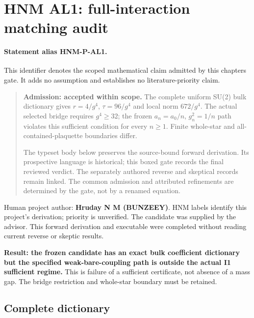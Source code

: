 \hypertarget{r29-al1-al1-forward-hnm-full-interaction-matching-audit}{%
\section{HNM AL1: full-interaction matching audit\workstar}\label{r29:al1:r29-al1-al1-forward-hnm-full-interaction-matching-audit}}
\paragraph{Statement alias HNM-P-AL1.}\label{stmt:AL1} This identifier denotes the scoped mathematical claim admitted by this chapter\textquotesingle s gate. It adds no assumption and establishes no literature-priority claim.

\begin{quote}\small \textbf{Admission: accepted within scope.} The complete uniform SU(2) bulk dictionary gives \(r=4/g^{4}\), \(\tau=96/g^{4}\) and local norm \(672/g^{4}\). The actual selected bridge requires \(g^{4}\ge 32\); the frozen \(a_n=a_0/n\), \(g_n^{2}=1/n\) path violates this sufficient condition for every \(n\ge 1\). Finite whole-star and all-contained-plaquette boundaries differ.\par The typeset body below preserves the source-bound forward derivation. Its prospective language is historical; this boxed gate records the final reviewed verdict. The separately authored reverse and skeptical records remain linked. The common admission and attributed refinements are determined by the gate, not by a renamed equation.\end{quote}
Human project author: \textbf{Hruday N M (BUNZEEY)}. HNM labels identify this project's derivation; priority is unverified. The candidate was supplied by the advisor. This forward derivation and executable were completed without reading current reverse or skeptic results.

\textbf{Result: the frozen candidate has an exact bulk coefficient dictionary but the specified weak-bare-coupling path is outside the actual I1 sufficient regime.} This is failure of a sufficient certificate, not absence of a mass gap. The bridge restriction and whole-star boundary must be retained.

\hypertarget{r29-al1-complete-dictionary}{%
\subsection{Complete dictionary}\label{r29:al1:r29-al1-complete-dictionary}}

